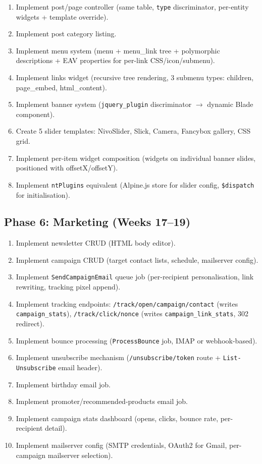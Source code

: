\documentclass[11pt,a4paper]{article}
\begin{document}
\begin{enumerate}[leftmargin=1.6em,itemsep=2pt]
  \item Implement post/page controller (same table, \texttt{type}
        discriminator, per-entity widgets + template override).
  \item Implement post category listing.
  \item Implement menu system (menu + menu\_link tree + polymorphic
        descriptions + EAV properties for per-link CSS/icon/submenu).
  \item Implement links widget (recursive tree rendering, 3 submenu
        types: children, page\_embed, html\_content).
  \item Implement banner system (\texttt{jquery\_plugin} discriminator
        $\to$ dynamic Blade component).
  \item Create 5 slider templates: NivoSlider, Slick, Camera, Fancybox
        gallery, CSS grid.
  \item Implement per-item widget composition (widgets on individual
        banner slides, positioned with offsetX/offsetY).
  \item Implement \texttt{ntPlugins} equivalent (Alpine.js store for
        slider config, \texttt{\$dispatch} for initialisation).
\end{enumerate}

\subsection{Phase 6: Marketing (Weeks 17--19)}

\begin{enumerate}[leftmargin=1.6em,itemsep=2pt]
  \item Implement newsletter CRUD (HTML body editor).
  \item Implement campaign CRUD (target contact lists, schedule,
        mailserver config).
  \item Implement \texttt{SendCampaignEmail} queue job (per-recipient
        personalisation, link rewriting, tracking pixel append).
  \item Implement tracking endpoints: \texttt{/track/open/{campaign}/{contact}}
        (writes \texttt{campaign\_stats}), \texttt{/track/click/{nonce}}
        (writes \texttt{campaign\_link\_stats}, 302 redirect).
  \item Implement bounce processing (\texttt{ProcessBounce} job, IMAP
        or webhook-based).
  \item Implement unsubscribe mechanism (\texttt{/unsubscribe/{token}}
        route + \texttt{List-Unsubscribe} email header).
  \item Implement birthday email job.
  \item Implement promoter/recommended-products email job.
  \item Implement campaign stats dashboard (opens, clicks, bounce
        rate, per-recipient detail).
  \item Implement mailserver config (SMTP credentials, OAuth2 for
        Gmail, per-campaign mailserver selection).
\end{enumerate}
\end{document}
